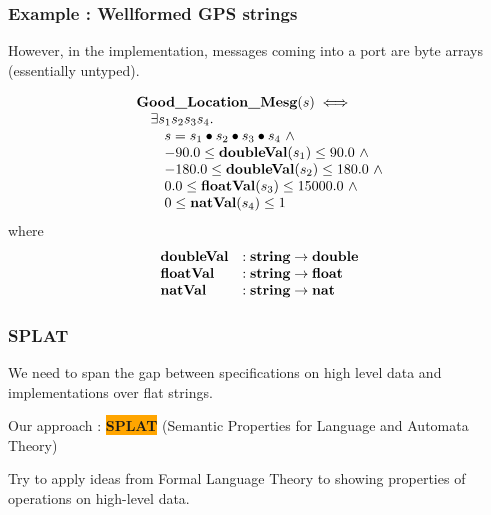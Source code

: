 \documentclass{beamer}
\newcommand{\kemph}[1]{\colorbox{orange}{#1}}
\newcommand{\konst}[1]{\ensuremath{\mbox{\bf{#1}}}}
\begin{document}
\begin{frame}\frametitle{Example : Wellformed GPS strings}

However, in the implementation, messages coming into a port are
byte arrays (essentially untyped).

\[
\begin{array}{l}
 \konst{Good\_Location\_Mesg} (s) \iff \\
\quad   \exists s_1 s_2 s_3 s_4. \\
\qquad      s = s_1 \bullet s_2 \bullet s_3 \bullet s_4 \ \land \\
\qquad    -90.0 \leq \konst{doubleVal}(s_1) \leq 90.0 \ \land \\
\qquad   -180.0 \leq \konst{doubleVal}(s_2) \leq 180.0 \ \land \\
\qquad      0.0 \leq \konst{floatVal}(s_3)  \leq 15000.0 \ \land \\
\qquad        0 \leq \konst{natVal}(s_4) \leq 1
\end{array}
\]
%
\noindent where
%
\[
\begin{array}{ll}
 \konst{doubleVal} & : \konst{string} \to \konst{double} \\
 \konst{floatVal}  & : \konst{string} \to \konst{float}  \\
 \konst{natVal}    & : \konst{string} \to \konst{nat}  \\
\end{array}
\]

\end{frame}

\begin{frame}\frametitle{SPLAT}

We need to span the gap between specifications on high level data and
implementations over flat strings.

Our approach : \kemph{\textbf{SPLAT}} (Semantic Properties for Language and Automata Theory)

Try to apply ideas from Formal Language Theory to showing properties
of operations on high-level data.

\end{frame}
\end{document}
